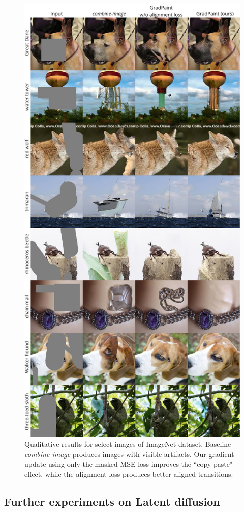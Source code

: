 \begin{figure}[h]
  \centering
    \includegraphics[width=0.85\linewidth]{images/gradpaint/vis_ablation.pdf}
    \caption{Qualitative results for select images of ImageNet dataset. Baseline \emph{combine-image} produces  images with visible artifacts. Our gradient update using only the masked MSE loss improves the ``copy-paste" effect, while the alignment loss produces better aligned transitions.}
    \label{fig:vis_ablation}
\end{figure}

\subsection{Further experiments on Latent diffusion}

